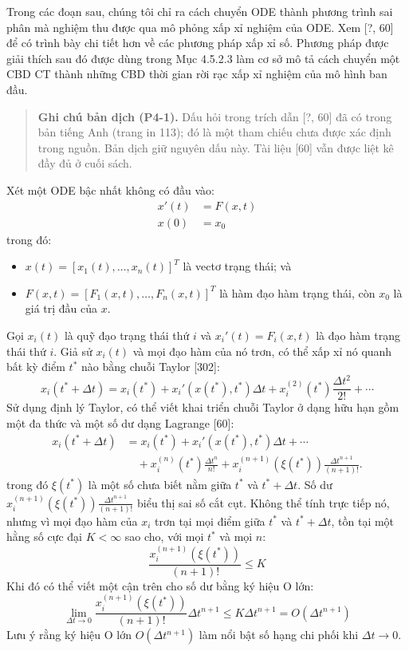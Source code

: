 Trong các đoạn sau, chúng tôi chỉ ra cách chuyển ODE thành phương trình sai phân mà nghiệm thu được qua mô phỏng xấp xỉ nghiệm của ODE. Xem [?, 60] để có trình bày chi tiết hơn về các phương pháp xấp xỉ số. Phương pháp được giải thích sau đó được dùng trong Mục 4.5.2.3 làm cơ sở mô tả cách chuyển một CBD CT thành những CBD thời gian rời rạc xấp xỉ nghiệm của mô hình ban đầu.

\begin{quote}
\small\textbf{Ghi chú bản dịch (P4-1).} Dấu hỏi trong trích dẫn [?, 60] đã có trong bản tiếng Anh (trang in 113); đó là một tham chiếu chưa được xác định trong nguồn. Bản dịch giữ nguyên dấu này. Tài liệu [60] vẫn được liệt kê đầy đủ ở cuối sách.
\end{quote}

Xét một ODE bậc nhất không có đầu vào:
\begin{equation}\begin{aligned}x'(t)&=F(x,t)\\x(0)&=x_0\end{aligned}\tag{4.8}\end{equation}
trong đó:
\begin{itemize}
\item $x(t)=[x_1(t),\ldots,x_n(t)]^T$ là vectơ trạng thái; và
\item $F(x,t)=[F_1(x,t),\ldots,F_n(x,t)]^T$ là hàm đạo hàm trạng thái, còn $x_0$ là giá trị đầu của $x$.
\end{itemize}
Gọi $x_i(t)$ là quỹ đạo trạng thái thứ $i$ và $x_i'(t)=F_i(x,t)$ là đạo hàm trạng thái thứ $i$. Giả sử $x_i(t)$ và mọi đạo hàm của nó trơn, có thể xấp xỉ nó quanh bất kỳ điểm $t^*$ nào bằng chuỗi Taylor [302]:
\begin{equation}
x_i(t^*+\Delta t)=x_i(t^*)+x_i'(x(t^*),t^*)\Delta t+x_i^{(2)}(t^*)\frac{\Delta t^2}{2!}+\cdots\tag{4.9}
\end{equation}
Sử dụng định lý Taylor, có thể viết khai triển chuỗi Taylor ở dạng hữu hạn gồm một đa thức và một số dư dạng Lagrange [60]:
\[\begin{aligned}
x_i(t^*+\Delta t)&=x_i(t^*)+x_i'(x(t^*),t^*)\Delta t+\cdots\\
&\quad+x_i^{(n)}(t^*)\frac{\Delta t^n}{n!}+x_i^{(n+1)}(\xi(t^*))\frac{\Delta t^{n+1}}{(n+1)!}.
\end{aligned}\]
trong đó $\xi(t^*)$ là một số chưa biết nằm giữa $t^*$ và $t^*+\Delta t$. Số dư $x_i^{(n+1)}(\xi(t^*))\frac{\Delta t^{n+1}}{(n+1)!}$ biểu thị sai số cắt cụt. Không thể tính trực tiếp nó, nhưng vì mọi đạo hàm của $x_i$ trơn tại mọi điểm giữa $t^*$ và $t^*+\Delta t$, tồn tại một hằng số cực đại $K<\infty$ sao cho, với mọi $t^*$ và mọi $n$:
\[\frac{x_i^{(n+1)}(\xi(t^*))}{(n+1)!}\le K\]
Khi đó có thể viết một cận trên cho số dư bằng ký hiệu O lớn:
\[\lim_{\Delta t\to0}\frac{x_i^{(n+1)}(\xi(t^*))}{(n+1)!}\Delta t^{n+1}\le K\Delta t^{n+1}=O(\Delta t^{n+1})\]
Lưu ý rằng ký hiệu O lớn $O(\Delta t^{n+1})$ làm nổi bật số hạng chi phối khi $\Delta t\to0$.


